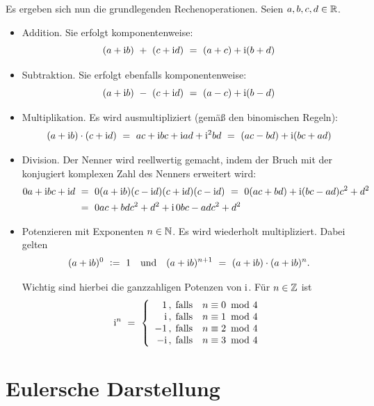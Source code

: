 Es ergeben sich nun die grundlegenden Rechenoperationen. Seien $a,b,c,d\in\mathbb{R}$.
\begin{itemize}
\addtolength{\itemsep}{-1em}
\item{}Addition. Sie erfolgt komponentenweise:
\[
(a+\mathrm{i} b)\ +\ (c+\mathrm{i} d)
\ =\ (a+c)+\mathrm{i}(b+d)
\]

\item{}Subtraktion. Sie erfolgt ebenfalls komponentenweise:
\[
(a+\mathrm{i} b)\ -\ (c+\mathrm{i} d)
\ =\ (a-c)+\mathrm{i}(b-d)
\]

\item{}Multiplikation. Es wird ausmultipliziert (gemäß den binomischen
Regeln):
\[
(a+\mathrm{i} b)\cdot(c+\mathrm{i} d)
\ =\ ac+\mathrm{i} bc+\mathrm{i} ad+\mathrm{i}^2bd
\ =\ (ac-bd)+\mathrm{i}(bc+ad)
\]

\item{}Division. Der Nenner wird reellwertig gemacht, indem der Bruch mit der konjugiert komplexen Zahl des Nenners erweitert wird:
\begin{align*}
\frac{a+\imag b}{c+\imag d}
&\ =\ \frac{(a+\imag b)(c-\imag d)}{(c+\imag d)(c-\imag d)}
\ =\ \frac{(ac+bd)+\imag(bc-ad)}{c^2+d^2}
\\
&\ =\ \frac{ac+bd}{c^2+d^2}+\imag\,\frac{bc-ad}{c^2+d^2}
\end{align*}

\item{}Potenzieren mit Exponenten $n\in\mathbb{N}$. Es wird wiederholt multipliziert. Dabei gelten
\[
(a+\mathrm{i} b)^0
\ \mathrel{\mathop:}=\ 1
\quad\text{und}\quad
(a+\mathrm{i} b)^{n+1}
\ =\ (a+\mathrm{i} b)\cdot(a+\mathrm{i} b)^n
.
\]


Wichtig sind hierbei die ganzzahligen Potenzen von $\mathrm{i}$. Für $n\in\mathbb{Z}$
ist
\[
\imag^n
\ =\ \left\{\begin{array}{r@{\,,\; \text{falls}\quad}l}
1      & n\equiv0\!\mod4\\
\imag  & n\equiv1\!\mod4\\
-1     & n\equiv2\!\mod4\\
-\imag & n\equiv3\!\mod4
\end{array}\right.
\]
\end{itemize}
\section{Eulersche Darstellung}

